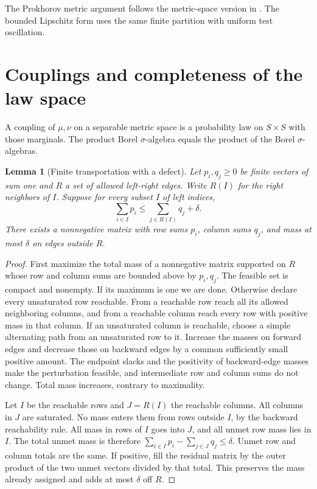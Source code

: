 \documentclass[11pt,oneside,openany]{book}
\theoremstyle{plain}
\newtheorem{lemma}[theorem]{Lemma}
\theoremstyle{definition}
\theoremstyle{remark}
\begin{document}
The Prokhorov metric argument follows the metric-space version in
\cite[\S6(iii)--(iv), p.~72]{Billingsley}. The bounded Lipschitz
form uses the same finite partition with uniform test oscillation.

\section{Couplings and completeness of the law space}
\label{p06-10}

A coupling of \(\mu,\nu\) on a separable metric space is a
probability law on \(S\times S\) with those marginals. The product
Borel \(\sigma\)-algebra equals the product of the Borel
\(\sigma\)-algebras.

\begin{lemma}[Finite transportation with a defect]
\label{lem:p06-finite-transport}
Let \(p_i,q_j\geq0\) be finite vectors of sum one and
\(R\) a set of allowed left-right edges. Write \(R(I)\)
for the right neighbors of \(I\). Suppose for every subset \(I\)
of left indices,
\[
 \sum_{i\in I}p_i\leq\sum_{j\in R(I)}q_j+\delta.
\]
There exists a nonnegative matrix with row sums \(p_i\), column
sums \(q_j\), and mass at most \(\delta\) on edges outside \(R\).
\end{lemma}

\begin{proof}
First maximize the total mass of a nonnegative matrix supported
on \(R\) whose row and column sums are bounded above by \(p_i,q_j\).
The feasible set is compact and nonempty. If its maximum is one
we are done. Otherwise declare every unsaturated row reachable.
From a reachable row reach all its allowed neighboring columns,
and from a reachable column reach every row with positive
mass in that column. If an unsaturated column is reachable,
choose a simple alternating path from an unsaturated row to it.
Increase the masses on forward edges and decrease those on
backward edges by a common sufficiently small positive amount.
The endpoint slacks and the positivity of backward-edge masses
make the perturbation feasible, and intermediate row and column
sums do not change. Total mass increases, contrary to maximality.

Let \(I\) be the reachable rows and \(J=R(I)\) the reachable
columns. All columns in \(J\) are saturated. No mass enters them
from rows outside \(I\), by the backward reachability rule.
All mass in rows of \(I\) goes into \(J\), and all unmet row
mass lies in \(I\). The total unmet mass is therefore
\(\sum_{i\in I}p_i-\sum_{j\in J}q_j\leq\delta\).
Unmet row and column totals are the same. If positive, fill the
residual matrix by the outer product of the two unmet vectors
divided by that total. This preserves the mass already assigned
and adds at most \(\delta\) off \(R\).
\end{proof}
\end{document}
